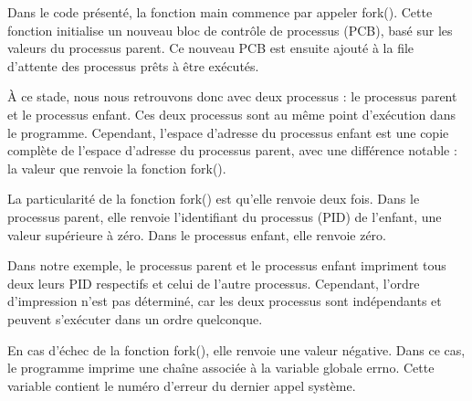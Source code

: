 \documentclass[12pt]{article}
\begin{document}
Dans le code présenté, la fonction main commence par appeler fork(). Cette fonction initialise un nouveau bloc de contrôle de processus (PCB), basé sur les valeurs du processus parent. Ce nouveau PCB est ensuite ajouté à la file d'attente des processus prêts à être exécutés.

À ce stade, nous nous retrouvons donc avec deux processus : le processus parent et le processus enfant. Ces deux processus sont au même point d'exécution dans le programme. Cependant, l'espace d'adresse du processus enfant est une copie complète de l'espace d'adresse du processus parent, avec une différence notable : la valeur que renvoie la fonction fork().

La particularité de la fonction fork() est qu'elle renvoie deux fois. Dans le processus parent, elle renvoie l'identifiant du processus (PID) de l'enfant, une valeur supérieure à zéro. Dans le processus enfant, elle renvoie zéro. 

Dans notre exemple, le processus parent et le processus enfant impriment tous deux leurs PID respectifs et celui de l'autre processus. Cependant, l'ordre d'impression n'est pas déterminé, car les deux processus sont indépendants et peuvent s'exécuter dans un ordre quelconque.

En cas d'échec de la fonction fork(), elle renvoie une valeur négative. Dans ce cas, le programme imprime une chaîne associée à la variable globale errno. Cette variable contient le numéro d'erreur du dernier appel système.
\end{document}
